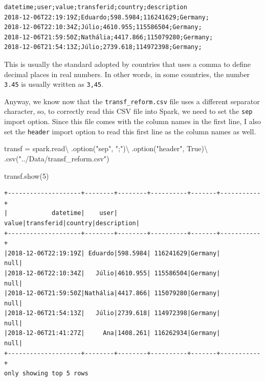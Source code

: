 \documentclass[
  11pt,
  letterpaper,
  DIV=11,
  numbers=noendperiod]{scrreprt}
\newenvironment{Shaded}{\begin{snugshade}}{\end{snugshade}}
\newcommand{\DecValTok}[1]{\textcolor[rgb]{0.68,0.00,0.00}{#1}}
\newcommand{\NormalTok}[1]{\textcolor[rgb]{0.00,0.23,0.31}{#1}}
\newcommand{\OperatorTok}[1]{\textcolor[rgb]{0.37,0.37,0.37}{#1}}
\newcommand{\StringTok}[1]{\textcolor[rgb]{0.13,0.47,0.30}{#1}}
\newcommand{\VariableTok}[1]{\textcolor[rgb]{0.07,0.07,0.07}{#1}}
\begin{document}
\begin{verbatim}
datetime;user;value;transferid;country;description
2018-12-06T22:19:19Z;Eduardo;598.5984;116241629;Germany;
2018-12-06T22:10:34Z;Júlio;4610.955;115586504;Germany;
2018-12-06T21:59:50Z;Nathália;4417.866;115079280;Germany;
2018-12-06T21:54:13Z;Júlio;2739.618;114972398;Germany;
\end{verbatim}

This is usually the standard adopted by countries that uses a comma to
define decimal places in real numbers. In other words, in some
countries, the number \texttt{3.45} is usually written as \texttt{3,45}.

Anyway, we know now that the \texttt{transf\_reform.csv} file uses a
different separator character, so, to correctly read this CSV file into
Spark, we need to set the \texttt{sep} import option. Since this file
comes with the column names in the first line, I also set the
\texttt{header} import option to read this first line as the column
names as well.

\begin{Shaded}
\begin{Highlighting}[]
\NormalTok{transf }\OperatorTok{=}\NormalTok{ spark.read}\OperatorTok{\textbackslash{}}
\NormalTok{  .option(}\StringTok{"sep"}\NormalTok{, }\StringTok{";"}\NormalTok{)}\OperatorTok{\textbackslash{}}
\NormalTok{  .option(}\StringTok{"header"}\NormalTok{, }\VariableTok{True}\NormalTok{)}\OperatorTok{\textbackslash{}}
\NormalTok{  .csv(}\StringTok{"../Data/transf\_reform.csv"}\NormalTok{)}
  
\NormalTok{transf.show(}\DecValTok{5}\NormalTok{)}
\end{Highlighting}
\end{Shaded}

\begin{verbatim}
+--------------------+--------+--------+----------+-------+-----------+
|            datetime|    user|   value|transferid|country|description|
+--------------------+--------+--------+----------+-------+-----------+
|2018-12-06T22:19:19Z| Eduardo|598.5984| 116241629|Germany|       null|
|2018-12-06T22:10:34Z|   Júlio|4610.955| 115586504|Germany|       null|
|2018-12-06T21:59:50Z|Nathália|4417.866| 115079280|Germany|       null|
|2018-12-06T21:54:13Z|   Júlio|2739.618| 114972398|Germany|       null|
|2018-12-06T21:41:27Z|     Ana|1408.261| 116262934|Germany|       null|
+--------------------+--------+--------+----------+-------+-----------+
only showing top 5 rows
\end{verbatim}
\end{document}
